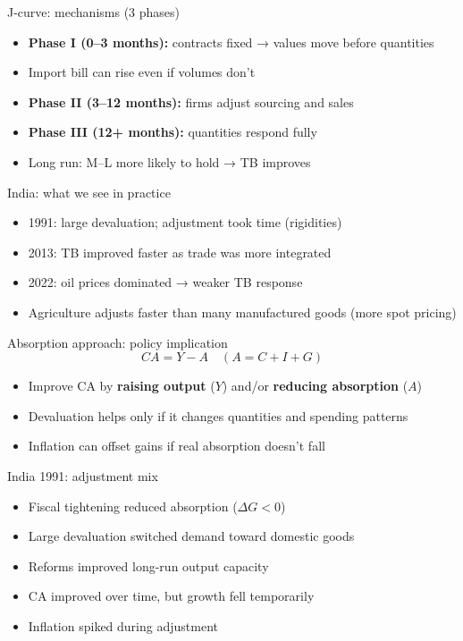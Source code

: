 \documentclass[
  ignorenonframetext,
  aspectratio=169,
]{beamer}
\makeatletter
\providecommand{\tightlist}{%
  \setlength{\itemsep}{0pt}\setlength{\parskip}{0pt}}
\let\quarto@originallabel\label
\DeclareRobustCommand*{\label}[1]{\quarto@originallabel{#1}}
\makeatother
\begin{document}
\begin{frame}{J-curve: mechanisms (3 phases)}
\label{j-curve-mechanisms-3-phases}
\begin{itemize}
\tightlist
\item
  \textbf{Phase I (0--3 months):} contracts fixed → values move before
  quantities
\item
  Import bill can rise even if volumes don't
\item
  \textbf{Phase II (3--12 months):} firms adjust sourcing and sales
\item
  \textbf{Phase III (12+ months):} quantities respond fully
\item
  Long run: M--L more likely to hold → TB improves
\end{itemize}
\end{frame}

\begin{frame}{India: what we see in practice}
\label{india-what-we-see-in-practice}
\begin{itemize}
\tightlist
\item
  1991: large devaluation; adjustment took time (rigidities)
\item
  2013: TB improved faster as trade was more integrated
\item
  2022: oil prices dominated → weaker TB response
\item
  Agriculture adjusts faster than many manufactured goods (more spot
  pricing)
\end{itemize}
\end{frame}

\begin{frame}{Absorption approach: policy implication}
\label{absorption-approach-policy-implication}
\[\boxed{CA = Y - A}\quad (A=C+I+G)\]

\begin{itemize}
\tightlist
\item
  Improve CA by \textbf{raising output} (\(Y\)) and/or \textbf{reducing
  absorption} (\(A\))
\item
  Devaluation helps only if it changes quantities and spending patterns
\item
  Inflation can offset gains if real absorption doesn't fall
\end{itemize}
\end{frame}

\begin{frame}{India 1991: adjustment mix}
\label{india-1991-adjustment-mix}
\begin{itemize}
\tightlist
\item
  Fiscal tightening reduced absorption (\(\Delta G<0\))
\item
  Large devaluation switched demand toward domestic goods
\item
  Reforms improved long-run output capacity
\item
  CA improved over time, but growth fell temporarily
\item
  Inflation spiked during adjustment
\end{itemize}
\end{frame}
\end{document}
